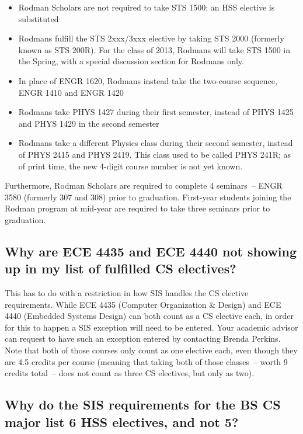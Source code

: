 \documentclass[10pt,letter]{book}
\newenvironment{itemlist}{
\begin{itemize}
\setlength{\itemsep}{0pt}
\setlength{\parskip}{0pt}}
{\end{itemize}}
\newcommand{\sisexceptionenterer}{Brenda Perkins}
\begin{document}
\begin{itemlist}
\item Rodman Scholars are not required to take STS 1500; an HSS
elective is substituted
\item Rodmans fulfill the STS 2xxx/3xxx elective by taking STS 2000
  (formerly known as STS 200R). For the class of 2013, Rodmans will
  take STS 1500 in the Spring, with a special discussion section for
  Rodmans only.
\item In place of ENGR 1620, Rodmans instead take the two-course
  sequence, ENGR 1410 and ENGR 1420
\item Rodmans take PHYS 1427 during their first semester,
  instead of PHYS 1425 and PHYS 1429 in the second
  semester
\item Rodmans take a different Physics class during their second
  semester, instead of PHYS 2415 and PHYS 2419. This
  class used to be called PHYS 241R; as of print time, the new 4-digit
  course number is not yet known.
\end{itemlist}

Furthermore, Rodman Scholars are required to complete 4 seminars~--
ENGR 3580 (formerly 307 and 308) prior to graduation. First-year
students joining the Rodman program at mid-year are required to take
three seminars prior to graduation.

\subsection{Why are ECE 4435 and ECE 4440 not showing up in my list of
  fulfilled CS electives?}
\label{sec:sisece4435issue}

This has to do with a restriction in how SIS handles the CS elective
requirements.  While ECE 4435 (Computer Organization \& Design)
and ECE 4440 (Embedded Systems Design) can both count as a CS
elective each, in order for this to happen a SIS exception will need
to be entered.  Your academic advisor can request to have such an
exception entered by contacting \sisexceptionenterer.  Note that both
of those courses only count as one elective each, even though they are
4.5 credits per course (meaning that taking both of those classes~--
worth 9 credits total~-- does not count as three CS electives, but
only as two).

\subsection{Why do the SIS requirements for the BS CS major list 6 HSS
  electives, and not 5?}
\label{sec:sishssissue}
\end{document}
